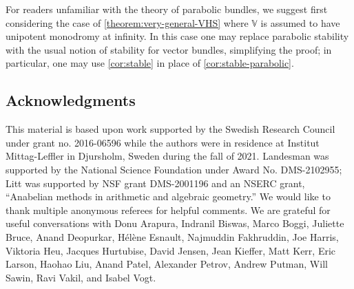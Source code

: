For readers unfamiliar with the theory of parabolic bundles, we suggest first considering the case of \autoref{theorem:very-general-VHS} where $\mathbb{V}$ is assumed to have unipotent monodromy at infinity. In this case one may replace parabolic stability with the usual notion of stability for vector bundles,  simplifying the proof;  in particular, one may use \autoref{cor:stable} in place of \autoref{cor:stable-parabolic}.
\subsection{Acknowledgments}
This material is based upon work supported by the Swedish Research Council under
grant no. 2016-06596 while the authors were in residence at Institut
Mittag-Leffler in Djursholm, Sweden during the fall of 2021.
Landesman was supported by the National Science
Foundation under Award No. DMS-2102955;
Litt was supported by NSF grant DMS-2001196 and an NSERC grant, “Anabelian methods in arithmetic and algebraic geometry.”
We would like to thank multiple anonymous referees for helpful comments.
We are grateful for useful conversations with
Donu Arapura,
Indranil Biswas,
Marco Boggi,
Juliette Bruce,
Anand Deopurkar,
H\'el\`ene Esnault,
Najmuddin Fakhruddin,
Joe Harris,
Viktoria Heu,
Jacques Hurtubise,
David Jensen,
Jean Kieffer,
Matt Kerr,
Eric Larson,
Haohao Liu,
Anand Patel,
Alexander Petrov,
Andrew Putman,
Will Sawin,
Ravi Vakil,
and Isabel Vogt.
